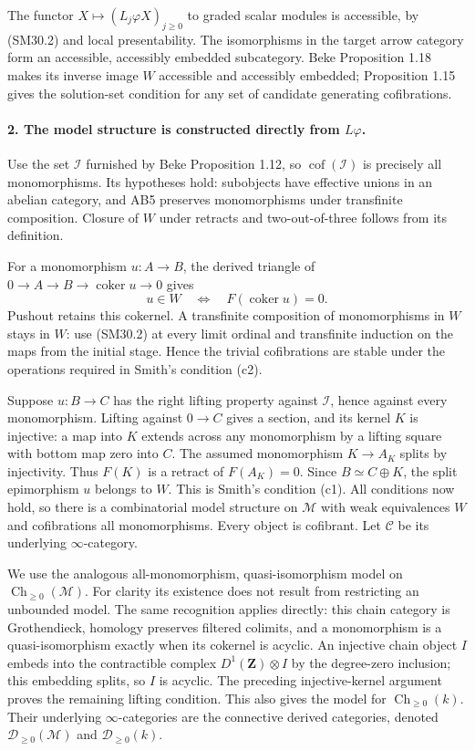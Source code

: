 The functor \(X\mapsto(L_j\varphi X)_{j\ge0}\) to graded
scalar modules is accessible, by (SM30.2) and local
presentability.  The isomorphisms in the target arrow category
form an accessible, accessibly embedded subcategory.
Beke Proposition 1.18 makes its inverse image \(W\) accessible
and accessibly embedded; Proposition 1.15 gives the solution-set
condition for any set of candidate generating cofibrations.

\paragraph{2. The model structure is constructed directly from \(L\varphi\).}
Use the set \(\mathcal I\) furnished by Beke Proposition 1.12,
so \(\operatorname{cof}(\mathcal I)\) is precisely all
monomorphisms.  Its hypotheses hold: subobjects have effective
unions in an abelian category, and AB5 preserves monomorphisms
under transfinite composition.  Closure of \(W\) under retracts
and two-out-of-three follows from its definition.

For a monomorphism \(u:A\to B\), the derived triangle of
\(0\to A\to B\to\operatorname{coker}u\to0\) gives
\[
 u\in W\quad\Longleftrightarrow\quad F(\operatorname{coker}u)=0.
                                                               \tag{SM30.4}
\]
Pushout retains this cokernel.  A transfinite composition of
monomorphisms in \(W\) stays in \(W\): use (SM30.2) at every
limit ordinal and transfinite induction on the maps from the
initial stage.  Hence the trivial cofibrations are stable under
the operations required in Smith's condition (c2).

Suppose \(u:B\to C\) has the right lifting property against
\(\mathcal I\), hence against every monomorphism.  Lifting
against \(0\to C\) gives a section, and its kernel \(K\) is
injective: a map into \(K\) extends across any monomorphism
by a lifting square with bottom map zero into \(C\).
The assumed monomorphism \(K\to A_K\) splits by injectivity.
Thus \(F(K)\) is a retract of \(F(A_K)=0\).
Since \(B\simeq C\oplus K\), the split epimorphism \(u\)
belongs to \(W\).  This is Smith's condition (c1).
All conditions now hold, so there is a combinatorial model
structure on \(\mathcal M\) with weak equivalences \(W\)
and cofibrations all monomorphisms.  Every object is cofibrant.
Let \(\mathcal C\) be its underlying \(\infty\)-category.

We use the analogous all-monomorphism, quasi-isomorphism model
on \(\operatorname{Ch}_{\ge0}(\mathcal M)\).
For clarity its existence does not result from restricting an
unbounded model.  The same recognition applies directly:
this chain category is Grothendieck, homology preserves filtered
colimits, and a monomorphism is a quasi-isomorphism exactly
when its cokernel is acyclic.  An injective chain object \(I\)
embeds into the contractible complex \(D^1(\mathbf Z)\otimes I\)
by the degree-zero inclusion; this embedding splits, so \(I\)
is acyclic.  The preceding injective-kernel argument proves
the remaining lifting condition.  This also gives the model
for \(\operatorname{Ch}_{\ge0}(k)\).
Their underlying \(\infty\)-categories are the connective
derived categories, denoted \(\mathcal D_{\ge0}(\mathcal M)\)
and \(\mathcal D_{\ge0}(k)\).

